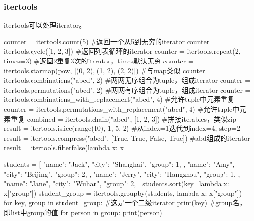     \subsubsection{itertools}
      itertools可以处理iterator。
      \begin{codeblock}[language=python, caption={itertools}]
        counter = itertools.count(5) #返回一个从5到无穷的iterator
        counter = itertools.cycle([1, 2, 3]) #返回列表循环的iterator
        counter = itertools.repeat(2, times=3) #返回2重复3次的iterator，times默认无穷
        counter = itertools.starmap(pow, [(0, 2), (1, 2), (2, 2)]) #与map类似
        counter = itertools.combinations("abcd", 2) #两两无序组合为tuple，组成iterator
        counter = itertools.permutations("abcd", 2) #两两有序组合为tuple，组成iterator
        counter = itertools.combinations_with_replacement("abcd", 4) #允许tuple中元素重复
        counter = itertools.permutations_with_replacement("abcd", 4) #允许tuple中元素重复
        combined = itertools.chain("abcd", [1, 2, 3]) #拼接iterables，类似zip
        result = itertools.islice(range(10), 1, 5, 2) #从index=1迭代到index=4, step=2
        result = itertools.compress("abcd", [True, True, False, True]) #abd组成的iterator
        result = itertools.filterfalse(lambda x: x%

        students = [
          {
            "name": "Jack",
            "city": "Shanghai",
            "group": 1,
          },
          {
            "name": "Amy",
            "city": "Beijing",
            "group": 2,
          },
          {
            "name": "Jerry",
            "city": "Hangzhou",
            "group": 1,
          },
          {
            "name": "Jane",
            "city": "Wuhan",
            "group": 2,
          }
        ]
        students.sort(key=lambda x: x["group"])
        student_group = itertools.groupby(students, lambda x: x["group"])
        for key, group in student_group: #这是一个二级iterator
            print(key) #group名，即list中group的值
            for person in group:
              print(person)
      \end{codeblock}

